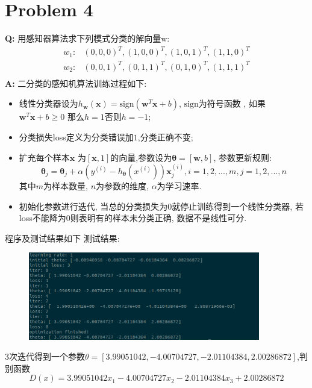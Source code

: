 \documentclass[12pt,a4paper]{article}
\begin{document}
 \section{Problem 4}
\textbf{Q: }
用感知器算法求下列模式分类的解向量w:
	\[ \begin{split} 
		 w_1: &{(0,0,0)^T, (1,0, 0)^T, (1, 0, 1)^T, (1, 1, 0)^T} \\
		 w_2: &{(0,0,1)^T, (0,1, 1)^T, (0, 1, 0)^T, (1, 1, 1)^T} \\
		\end{split}  
	\]
\textbf{A: }
 二分类的感知机算法训练过程如下:
  \begin{itemize}
  	\item 线性分类器设为$h_{\bm{w}}(\bm{x}) = \text{sign}(\bm{w}^T\bm{x} + b)$, $\text{sign}$为符号函数 ,
	  	如果 $\bm{w}^T\bm{x} + b \geq 0 $ 那么$h = 1$否则$h = -1$;
	\item 分类损失loss定义为分类错误加$1$,分类正确不变; 
	\item 扩充每个样本$\bm{x}$ 为$[\bm{x},1]$的向量,参数设为$\bm{\theta} = [\bm{w}, b]$, 参数更新规则:
		\[
			\bm{\theta}_j = \bm{\theta}_j + \alpha (y^{(i)} - h_{\bm{\theta}}(x^{(i)}))\bm{x}_j^{(i)}, i= 1,2,...,m, j=1,2,...,n
		\]
		其中$m$为样本数量, $n$为参数的维度, $\alpha$为学习速率.
	\item 初始化参数进行迭代, 当总的分类损失为0就停止训练得到一个线性分类器, 若loss不能降为0则表明有的样本未分类正确,
		数据不是线性可分.
  \end{itemize}
  程序及测试结果如下
  测试结果:   
  \begin{figure}[H]
  	\centering
  	\includegraphics[width = 0.9\textwidth]{result}
  \end{figure}
  $3$次迭代得到一个参数$\theta = [3.99051042 ,-4.00704727, -2.01104384,  2.00286872]$,判别函数
  \[
	  D(x) = 3.99051042x_1 -4.00704727x_2 -2.01104384x_3 +  2.00286872
  \]
\end{document}
